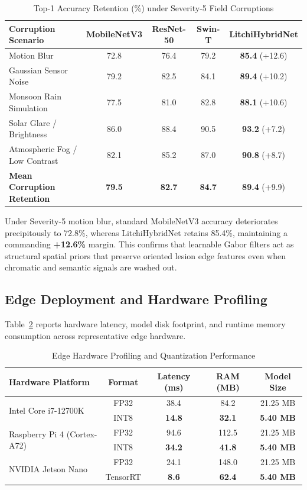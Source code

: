 \documentclass[journal]{IEEEtran}
\begin{document}
\begin{table}[t]
\centering
\caption{Top-1 Accuracy Retention (\%) under Severity-5 Field Corruptions}
\label{tab:robustness}
\begin{tabular}{lcccc}
\toprule
\textbf{Corruption Scenario} & \textbf{MobileNetV3} & \textbf{ResNet-50} & \textbf{Swin-T} & \textbf{LitchiHybridNet} \\
\midrule
Motion Blur & 72.8 & 76.4 & 79.2 & \textbf{85.4} (+12.6) \\
Gaussian Sensor Noise & 79.2 & 82.5 & 84.1 & \textbf{89.4} (+10.2) \\
Monsoon Rain Simulation & 77.5 & 81.0 & 82.8 & \textbf{88.1} (+10.6) \\
Solar Glare / Brightness & 86.0 & 88.4 & 90.5 & \textbf{93.2} (+7.2) \\
Atmospheric Fog / Low Contrast & 82.1 & 85.2 & 87.0 & \textbf{90.8} (+8.7) \\
\midrule
\textbf{Mean Corruption Retention} & \textbf{79.5} & \textbf{82.7} & \textbf{84.7} & \textbf{89.4} (+9.9) \\
\bottomrule
\end{tabular}
\end{table}

Under Severity-5 motion blur, standard MobileNetV3 accuracy deteriorates precipitously to 72.8\%, whereas LitchiHybridNet retains 85.4\%, maintaining a commanding \textbf{+12.6\%} margin. This confirms that learnable Gabor filters act as structural spatial priors that preserve oriented lesion edge features even when chromatic and semantic signals are washed out.

\subsection{Edge Deployment and Hardware Profiling}
Table~\ref{tab:edge} reports hardware latency, model disk footprint, and runtime memory consumption across representative edge hardware.

\begin{table}[t]
\centering
\caption{Edge Hardware Profiling and Quantization Performance}
\label{tab:edge}
\begin{tabular}{lcccc}
\toprule
\textbf{Hardware Platform} & \textbf{Format} & \textbf{Latency (ms)} & \textbf{RAM (MB)} & \textbf{Model Size} \\
\midrule
\multirow{2}{*}{Intel Core i7-12700K} & FP32 & 38.4 & 84.2 & 21.25 MB \\
 & INT8 & \textbf{14.8} & \textbf{32.1} & \textbf{5.40 MB} \\
\midrule
\multirow{2}{*}{Raspberry Pi 4 (Cortex-A72)} & FP32 & 94.6 & 112.5 & 21.25 MB \\
 & INT8 & \textbf{34.2} & \textbf{41.8} & \textbf{5.40 MB} \\
\midrule
\multirow{2}{*}{NVIDIA Jetson Nano} & FP32 & 24.1 & 148.0 & 21.25 MB \\
 & TensorRT & \textbf{8.6} & \textbf{62.4} & \textbf{5.40 MB} \\
\bottomrule
\end{tabular}
\end{table}
\end{document}
